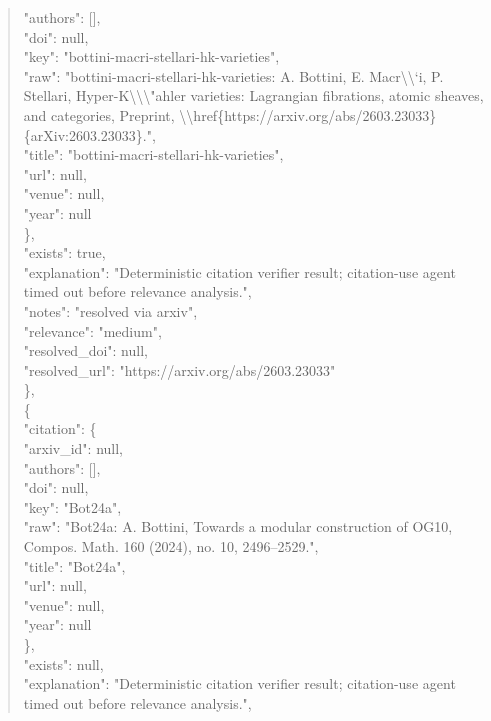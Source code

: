 \documentclass[11pt]{article}
\begin{document}
\begin{quote}
        "authors": [],\\
        "doi": null,\\
        "key": "bottini-macri-stellari-hk-varieties",\\
        "raw": "bottini-macri-stellari-hk-varieties: A. Bottini, E. Macr\textbackslash{}\textbackslash{}`i, P. Stellari, Hyper-K\textbackslash{}\textbackslash{}\textbackslash{}"ahler varieties: Lagrangian fibrations, atomic sheaves, and categories, Preprint, \textbackslash{}\textbackslash{}href\{https://arxiv.org/abs/2603.23033\}\{arXiv:2603.23033\}.",\\
        "title": "bottini-macri-stellari-hk-varieties",\\
        "url": null,\\
        "venue": null,\\
        "year": null\\
      \},\\
      "exists": true,\\
      "explanation": "Deterministic citation verifier result; citation-use agent timed out before relevance analysis.",\\
      "notes": "resolved via arxiv",\\
      "relevance": "medium",\\
      "resolved\_doi": null,\\
      "resolved\_url": "https://arxiv.org/abs/2603.23033"\\
    \},\\
    \{\\
      "citation": \{\\
        "arxiv\_id": null,\\
        "authors": [],\\
        "doi": null,\\
        "key": "Bot24a",\\
        "raw": "Bot24a: A. Bottini, Towards a modular construction of OG10, Compos. Math. 160 (2024), no. 10, 2496--2529.",\\
        "title": "Bot24a",\\
        "url": null,\\
        "venue": null,\\
        "year": null\\
      \},\\
      "exists": null,\\
      "explanation": "Deterministic citation verifier result; citation-use agent timed out before relevance analysis.",\\

\end{quote}
\end{document}
